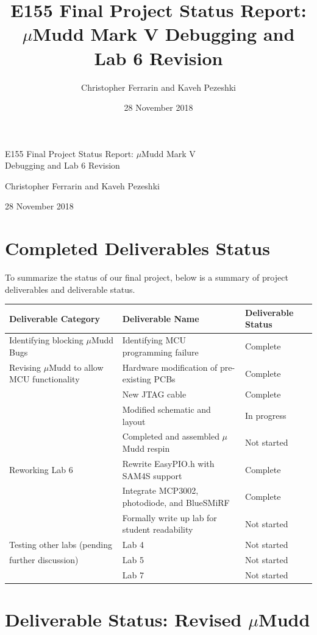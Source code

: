 \documentclass[12pt]{article}
\title{E155 Final Project Status Report: $\mu$Mudd Mark V Debugging and Lab 6 Revision}
\author{Christopher Ferrarin and Kaveh Pezeshki}
\date{28 November 2018}
\begin{document}
	\begin{LARGE}
	\noindent
		E155 
		Final 
		Project 
		Status
		Report: 
		$\mu$Mudd 
		Mark V \\
		Debugging 
		and 
		Lab 
		6 
		Revision
	\end{LARGE}

	\vspace{0.2cm}
	
	\begin{large}
	Christopher Ferrarin and Kaveh Pezeshki
	
	28 November 2018
	\end{large}

\section{Completed Deliverables Status}
To summarize the status of our final project, below is a summary of project deliverables and deliverable status.

	\begin{center}
	\begin{tabular}{p{6cm}p{5cm}p{4cm}}
	Deliverable Category & Deliverable Name & Deliverable Status\\
	\hline
	Identifying blocking $\mu$Mudd Bugs & Identifying MCU programming failure & Complete \\
	Revising $\mu$Mudd to allow MCU functionality & Hardware modification of pre-existing PCBs & Complete \\
	& New JTAG cable & Complete \\
	& Modified schematic and layout & In progress \\
	& Completed and assembled $\mu$Mudd respin & Not started \\
	Reworking Lab 6 & Rewrite EasyPIO.h with SAM4S support & Complete \\
	& Integrate MCP3002, photodiode, and BlueSMiRF & Complete \\
	& Formally write up lab for student readability & Not started \\
	Testing other labs (pending& Lab 4 & Not started \\
	 further discussion)& Lab 5 & Not started \\
	& Lab 7 & Not started
	\end{tabular}
	\end{center}

\section{Deliverable Status: Revised $\mu$Mudd}
\end{document}
